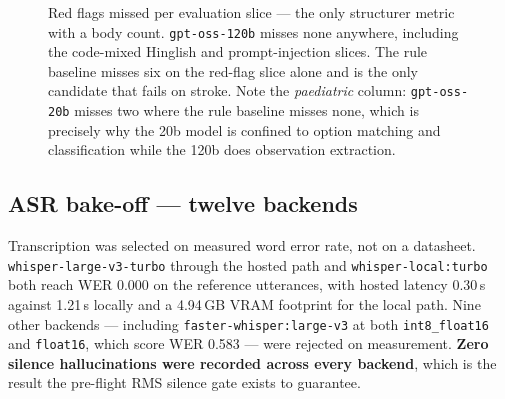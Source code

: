\documentclass[10pt,a4paper,twocolumn]{article}
\newcommand{\cm}[1]{\texttt{#1}}
\begin{document}
\begin{figure}[t]
\centering
{}
\caption{Red flags missed per evaluation slice --- the only structurer metric with a body count.
\cm{gpt-oss-120b} misses none anywhere, including the code-mixed Hinglish and prompt-injection
slices. The rule baseline misses six on the red-flag slice alone and is the only candidate that
fails on stroke. Note the \emph{paediatric} column: \cm{gpt-oss-20b} misses two where the rule
baseline misses none, which is precisely why the 20b model is confined to option matching and
classification while the 120b does observation extraction.}
\label{fig:slices}
\end{figure}

\subsection{ASR bake-off --- twelve backends}
Transcription was selected on measured word error rate, not on a datasheet.
\cm{whisper-large-v3-turbo} through the hosted path and \cm{whisper-local:turbo} both reach WER
0.000 on the reference utterances, with hosted latency 0.30\,s against 1.21\,s locally and a
4.94\,GB VRAM footprint for the local path. Nine other backends --- including
\cm{faster-whisper:large-v3} at both \cm{int8\_float16} and \cm{float16}, which score WER 0.583 ---
were rejected on measurement. \textbf{Zero silence hallucinations were recorded across every
backend}, which is the result the pre-flight RMS silence gate exists to guarantee.
\end{document}

